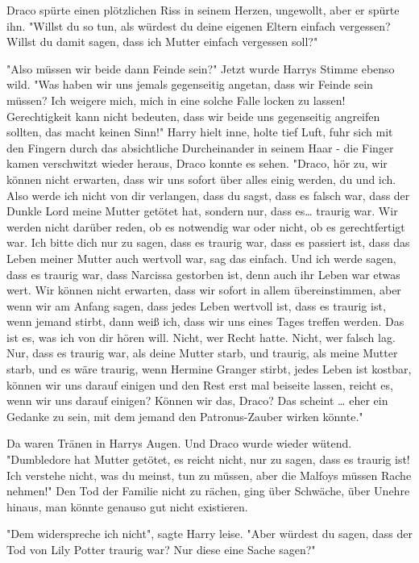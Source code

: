 {Draco spürte einen plötzlichen Riss in seinem Herzen, ungewollt, aber er spürte ihn. "Willst du so tun, als würdest du deine eigenen Eltern einfach vergessen? Willst du damit sagen, dass ich Mutter einfach vergessen soll?"

"Also müssen wir beide dann Feinde sein?" Jetzt wurde Harrys Stimme ebenso wild. "Was haben wir uns jemals gegenseitig angetan, dass wir Feinde sein müssen? Ich weigere mich, mich in eine solche Falle locken zu lassen! Gerechtigkeit kann nicht bedeuten, dass wir beide uns gegenseitig angreifen sollten, das macht keinen Sinn!" Harry hielt inne, holte tief Luft, fuhr sich mit den Fingern durch das absichtliche Durcheinander in seinem Haar - die Finger kamen verschwitzt wieder heraus, Draco konnte es sehen. "Draco, hör zu, wir können nicht erwarten, dass wir uns sofort über alles einig werden, du und ich. Also werde ich nicht von dir verlangen, dass du sagst, dass es falsch war, dass der Dunkle Lord meine Mutter getötet hat, sondern nur, dass es… traurig war. Wir werden nicht darüber reden, ob es notwendig war oder nicht, ob es gerechtfertigt war. Ich bitte dich nur zu sagen, dass es traurig war, dass es passiert ist, dass das Leben meiner Mutter auch wertvoll war, sag das einfach. Und ich werde sagen, dass es traurig war, dass Narcissa gestorben ist, denn auch ihr Leben war etwas wert. Wir können nicht erwarten, dass wir sofort in allem übereinstimmen, aber wenn wir am Anfang sagen, dass jedes Leben wertvoll ist, dass es traurig ist, wenn jemand stirbt, dann weiß ich, dass wir uns eines Tages treffen werden. Das ist es, was ich von dir hören will. Nicht, wer Recht hatte. Nicht, wer falsch lag. Nur, dass es traurig war, als deine Mutter starb, und traurig, als meine Mutter starb, und es wäre traurig, wenn Hermine Granger stirbt, jedes Leben ist kostbar, können wir uns darauf einigen und den Rest erst mal beiseite lassen, reicht es, wenn wir uns darauf einigen? Können wir das, Draco? Das scheint … eher ein Gedanke zu sein, mit dem jemand den Patronus-Zauber wirken könnte."

Da waren Tränen in Harrys Augen. Und Draco wurde wieder wütend. "Dumbledore hat Mutter getötet, es reicht nicht, nur zu sagen, dass es traurig ist! Ich verstehe nicht, was du meinst, tun zu müssen, aber die Malfoys müssen Rache nehmen!" Den Tod der Familie nicht zu rächen, ging über Schwäche, über Unehre hinaus, man könnte genauso gut nicht existieren.

"Dem widerspreche ich nicht", sagte Harry leise. "Aber würdest du sagen, dass der Tod von Lily Potter traurig war? Nur diese eine Sache sagen?"

}
